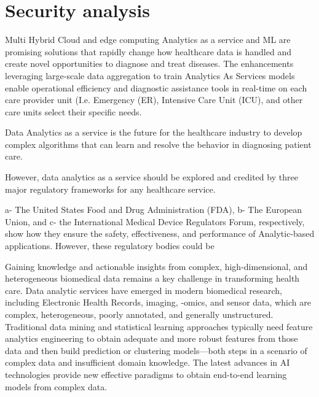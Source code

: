 \section{Security analysis}


Multi Hybrid Cloud and edge computing Analytics as a service and ML are promising solutions that rapidly change how healthcare data is handled and create novel opportunities to diagnose and treat diseases. The enhancements leveraging large-scale data aggregation to train Analytics As Services models enable operational efficiency and diagnostic assistance tools in real-time on each care provider unit (I.e. Emergency (ER), Intensive Care Unit (ICU), and other care units select their specific needs.

Data Analytics as a service is the future for the healthcare industry to develop complex algorithms that can learn and resolve the behavior in diagnosing patient care.

However, data analytics as a service should be explored and credited by three major regulatory frameworks for any healthcare service.

a- The United States Food and Drug Administration (FDA), 
b- The European Union, and 
c- the International Medical Device Regulators 
Forum, respectively, show how they ensure the safety, effectiveness, and performance of Analytic-based applications. However, these regulatory bodies could be
 
Gaining knowledge and actionable insights from complex, high-dimensional, and heterogeneous biomedical data remains a key challenge in transforming health care. Data analytic services have emerged in modern biomedical research, including Electronic Health Records, imaging, -omics, and sensor data, which are complex, heterogeneous, poorly annotated, and generally unstructured. Traditional data mining and statistical learning approaches typically need feature analytics engineering to obtain adequate and more robust features from those data and then build prediction or clustering models—both steps in a scenario of complex data and insufficient domain knowledge. The latest advances in AI technologies provide new effective paradigms to obtain end-to-end learning models from complex data.
 
